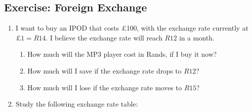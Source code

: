             \subsection{Exercise: Foreign Exchange }
            \nopagebreak
            \label{m39335*id68624}\begin{enumerate}[noitemsep, label=\textbf{\arabic*}. ] 
            \label{m39335*uid21}\item I want to buy an IPOD that costs £100, with the exchange rate currently at
\begin{math}£1=R14\end{math}. I believe the exchange rate will reach \begin{math}R12\end{math} in a month.
\label{m39335*id68677}\begin{enumerate}[noitemsep, label=\textbf{\alph*}. ] 
            \label{m39335*uid22}\item How much will the MP3 player cost in Rands, if I buy it now?
\label{m39335*uid23}\item How much will I save if the exchange rate drops to \begin{math}R12\end{math}?
\label{m39335*uid24}\item How much will I lose if the exchange rate moves to \begin{math}R15\end{math}?
\end{enumerate}
        
        \label{m39335*uid25}\item Study the following exchange rate table:

    
      

\end{enumerate}
